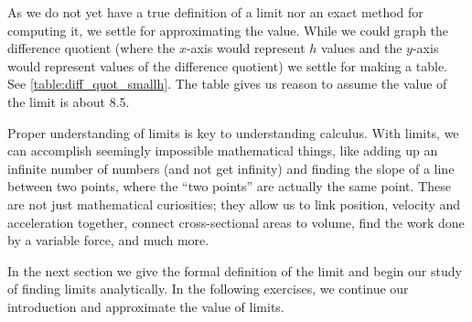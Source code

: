 As we do not yet have a true definition of a limit nor an exact method for computing it, we settle for approximating the value. While we could graph the difference quotient (where the $x$-axis would represent $h$ values and the $y$-axis would represent values of the difference quotient) we settle for making a table. See \autoref{table:diff_quot_smallh}.
%
%
%
%
%
%
The table gives us reason to assume the value of the limit is about 8.5. \bigskip

Proper understanding of limits is key to understanding calculus. With limits, we can accomplish seemingly impossible mathematical things, like adding up an infinite number of numbers (and not get infinity) and finding the slope of a line between two points, where the ``two points'' are actually the same point. These are not just mathematical curiosities; they allow us to link position, velocity and acceleration together, connect cross-sectional areas to volume, find the work done by a variable force,
and much more.

In the next section we give the formal definition of the limit and begin our study of finding limits analytically. In the following exercises, we continue our introduction and approximate the value of limits.

